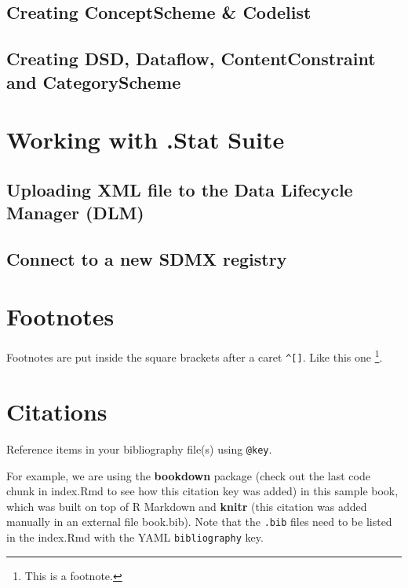 \documentclass[
]{book}
\theoremstyle{definition}
\theoremstyle{definition}
\theoremstyle{definition}
\theoremstyle{definition}
\theoremstyle{remark}
\begin{document}
\hypertarget{creating-conceptscheme}{%
\subsection{Creating ConceptScheme \& Codelist}\label{creating-conceptscheme}}

\hypertarget{creating-dsd}{%
\subsection{Creating DSD, Dataflow, ContentConstraint and CategoryScheme}\label{creating-dsd}}

\hypertarget{working-with-.stat-suite}{%
\section{Working with .Stat Suite}\label{working-with-.stat-suite}}

\hypertarget{upload-the}{%
\subsection{Uploading XML file to the Data Lifecycle Manager (DLM)}\label{upload-the}}

\hypertarget{connect-to}{%
\subsection{Connect to a new SDMX registry}\label{connect-to}}

\hypertarget{footnotes}{%
\section{Footnotes}\label{footnotes}}

Footnotes are put inside the square brackets after a caret \texttt{\^{}{[}{]}}. Like this one \footnote{This is a footnote.}.

\hypertarget{citations}{%
\section{Citations}\label{citations}}

Reference items in your bibliography file(s) using \texttt{@key}.

For example, we are using the \textbf{bookdown} package \citep{R-bookdown} (check out the last code chunk in index.Rmd to see how this citation key was added) in this sample book, which was built on top of R Markdown and \textbf{knitr} \citep{xie2015} (this citation was added manually in an external file book.bib).
Note that the \texttt{.bib} files need to be listed in the index.Rmd with the YAML \texttt{bibliography} key.
\end{document}
